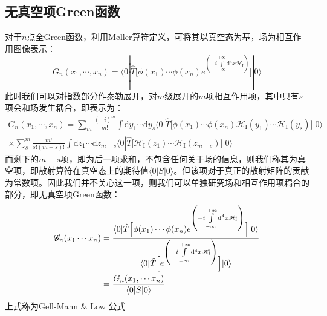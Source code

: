 \subsection{无真空项Green函数}
对于$n$点全Green函数，利用M\o{}ller算符定义，可将其以真空态为基，场为相互作用图像表示：
\begin{equation}
G_n(x_1,\cdots,x_n)=\langle0|\hat{T}\Big[\phi(x_1)\cdots\phi(x_n) e^{\left(-i\int\limits^{+\infty}_{-\infty}\mathrm{d}^4x\mathscr{H}_{\text{I}}\right)}\Big]|0\rangle
\end{equation}
此时我们可以对指数部分作泰勒展开，对$m$级展开的$m$项相互作用项，其中只有$s$项会和场发生耦合，即表示为：
	\begin{multline}
	G_n(x_1,\cdots,x_n)=\sum_{m}\frac{(-i)^m}{m!}\int\mathrm{d}y_1\cdots\mathrm{d}y_s\langle0|\hat{T}\Big[\phi(x_1)\cdots\phi(x_n)\mathscr{H}_{\text{I}}(y_1)\cdots\mathscr{H}_{\text{I}}(y_s)\Big]|0\rangle\\
	\times\sum_{s}^{m}\frac{m!}{s!(m-s)!}\int\mathrm{d}z_1\cdots\mathrm{d}z_{m-s}\langle0|\hat{T}\Big[\mathscr{H}_{\text{I}}(z_1)\cdots\mathscr{H}_{\text{I}}(z_{m-s})\Big]|0\rangle
	\end{multline}
而剩下的$m-s$项，即为后一项求和，不包含任何关于场的信息，则我们称其为真空项，即散射算符在真空态上的期待值$\langle 0 | S | 0 \rangle$。但该项对于真正的散射矩阵的贡献为常数项。因此我们并不关心这一项，则我们可以单独研究场和相互作用项耦合的部分，即无真空项Green函数：
\begin{align}
\mathscr{G}_n(x_1\cdots x_n)&=\frac{\langle0|\hat{T}\Big[\phi(x_1)\cdots\phi(x_n) e^{\left(-i\int\limits^{+\infty}_{-\infty}\mathrm{d}^4x\mathscr{H}_{\text{I}}\right)}\Big]|0\rangle}{\langle0|\hat{T}\Big[e^{\left(-i\int\limits^{+\infty}_{-\infty}\mathrm{d}^4x\mathscr{H}_{\text{I}}\right)}\Big]|0\rangle}\notag\\&=\frac{G_n(x_1,\cdots x_n)}{\langle0|S|0\rangle}	
\end{align}
上式称为Gell-Mann \& Low 公式
